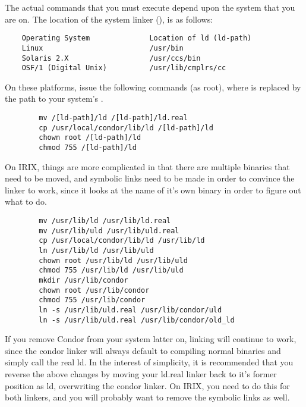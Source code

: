 The actual commands that you must execute depend upon the system that you
are on.  The location of the system linker (), is as follows:


\begin{verbatim}
	Operating System              Location of ld (ld-path)
	Linux                         /usr/bin
	Solaris 2.X                   /usr/ccs/bin
	OSF/1 (Digital Unix)          /usr/lib/cmplrs/cc
\end{verbatim}

On these platforms, issue the following commands (as root), where
 is replaced by the path to your system's .

\begin{verbatim}
        mv /[ld-path]/ld /[ld-path]/ld.real
        cp /usr/local/condor/lib/ld /[ld-path]/ld
        chown root /[ld-path]/ld
        chmod 755 /[ld-path]/ld
\end{verbatim}

On IRIX, things are more complicated in that there are multiple
 binaries that need to be moved, and symbolic links need to
be made in order to convince the linker to work, since it looks at the
name of it's own binary in order to figure out what to do.

\begin{verbatim}
        mv /usr/lib/ld /usr/lib/ld.real
        mv /usr/lib/uld /usr/lib/uld.real
        cp /usr/local/condor/lib/ld /usr/lib/ld
        ln /usr/lib/ld /usr/lib/uld
        chown root /usr/lib/ld /usr/lib/uld
        chmod 755 /usr/lib/ld /usr/lib/uld
        mkdir /usr/lib/condor
        chown root /usr/lib/condor
        chmod 755 /usr/lib/condor
        ln -s /usr/lib/uld.real /usr/lib/condor/uld
        ln -s /usr/lib/uld.real /usr/lib/condor/old_ld
\end{verbatim}

If you remove Condor from your system latter on, linking will continue
to work, since the condor linker will always default to compiling
normal binaries and simply call the real ld.  In the interest of
simplicity, it is recommended that you reverse the above changes by
moving your ld.real linker back to it's former position as ld,
overwriting the condor linker.  On IRIX, you need to do this for both
linkers, and you will probably want to remove the symbolic links as
well.

